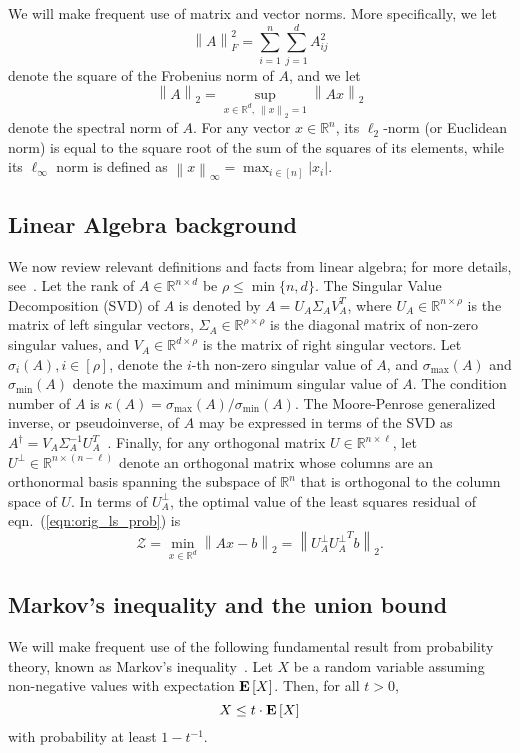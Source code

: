 \documentclass[11pt]{article}
\newcommand{\Expect}[1]{\mbox{}{\bf{E}}\left[#1\right]}
\newcommand{\FNormS}[1]{\mbox{}\left\|#1\right\|_F^2}
\newcommand{\TNorm }[1]{\mbox{}\left\|#1\right\|_2  }
\newcommand{\VTTNorm }[1]{\mbox{}\left\|#1\right\|_2  }
\newcommand{\VINorm }[1]{\mbox{}\left\|#1\right\|_{\infty}  }
\newcommand{\abs }[1]{\left|#1\right|}
\begin{document}
We will make frequent use of matrix and vector norms. More specifically, we let $$ \FNormS{A} = \sum_{i=1}^n \sum_{j=1}^d A_{ij}^2 $$ denote the square of the Frobenius norm of $A$, and we let $$\TNorm{A} = \sup_{x\in \mathbb{R}^d,\ \VTTNorm{x}=1} \VTTNorm{Ax}$$ denote the spectral norm of $A$. For any vector $x \in \mathbb{R}^n$, its $\ell_2$-norm (or Euclidean norm) is equal to the square root of the sum of the squares of its elements, while its $\ell_\infty$ norm is defined as $\VINorm{x} = \max_{i \in [n]} \abs{x_i}$.

\subsection{Linear Algebra background}

We now review relevant definitions and facts from linear algebra; for more details, see~\cite{Stewart90,GVL96,Bhatia97,BIG03}. Let the rank of $A \in \mathbb{R}^{n \times d}$ be $\rho \leq \min\{n,d\}$. The Singular Value Decomposition (SVD) of $A$ is denoted by $A = U_A \Sigma_A V_A^T$, where $U_A \in \mathbb{R}^{n \times \rho}$ is the matrix of left singular vectors, $\Sigma_A \in \mathbb{R}^{\rho \times \rho}$ is the diagonal matrix of non-zero singular values, and $V_A \in \mathbb{R}^{d \times \rho}$ is the matrix of right singular vectors. Let $\sigma_i(A), i\in [\rho]$, denote the $i$-th non-zero singular value of $A$, and $\sigma_{\max}(A)$ and $\sigma_{\min}(A)$ denote the maximum and minimum singular value of $A$. The condition number of $A$ is $\kappa(A) = \sigma_{\max}(A)/\sigma_{\min}(A)$. The Moore-Penrose generalized inverse, or pseudoinverse, of $A$ may be expressed in terms of the SVD as $A^{\dagger}=V_A\Sigma_A^{-1}U_A^T$~\cite{BIG03}. Finally, for any orthogonal matrix $U \in \mathbb{R}^{n \times \ell}$, let $U^{\perp} \in \mathbb{R}^{n \times (n-\ell)}$ denote an orthogonal matrix whose columns are an orthonormal basis spanning the subspace of $\mathbb{R}^n$ that is orthogonal to the column space of $U$.  In terms of $U_A^{\perp}$, the optimal value of the least squares residual of eqn.~(\ref{eqn:orig_ls_prob}) is
$$
\mathcal{Z} = \min_{x \in \mathbb{R}^d} \VTTNorm{Ax-b}
            = \VTTNorm{U_A^{\perp}{U_A^{\perp}}^Tb}         .
$$
\subsection{Markov's inequality and the union bound}

We will make frequent use of the following fundamental result from probability theory, known as Markov's inequality~\cite{MotwaniRaghavan95}. Let $X$ be a random variable assuming non-negative values with expectation $\Expect{X}$. Then, for all $t > 0$,
$$X \leq t \cdot \Expect{X}$$
with probability at least $1-t^{-1}$.
\end{document}
